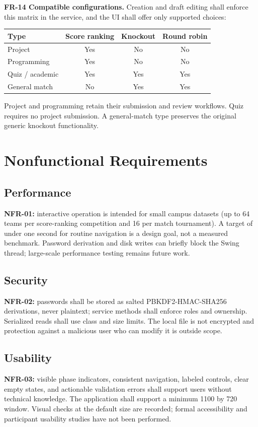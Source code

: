 \documentclass[12pt]{article}
\begin{document}
\textbf{FR-14 Compatible configurations.} Creation and draft editing shall enforce this matrix in the service, and the UI shall offer only supported choices:
\begin{tabularx}{\linewidth}{Yccc}\toprule Type & Score ranking & Knockout & Round robin\\\midrule
Project & Yes & No & No\\ Programming & Yes & No & No\\ Quiz / academic & Yes & Yes & Yes\\ General match & No & Yes & Yes\\\bottomrule\end{tabularx}
Project and programming retain their submission and review workflows. Quiz requires no project submission. A general-match type preserves the original generic knockout functionality.

\section{Nonfunctional Requirements}
\subsection{Performance}
\textbf{NFR-01:} interactive operation is intended for small campus datasets (up to 64 teams per score-ranking competition and 16 per match tournament). A target of under one second for routine navigation is a design goal, not a measured benchmark. Password derivation and disk writes can briefly block the Swing thread; large-scale performance testing remains future work.
\subsection{Security}
\textbf{NFR-02:} passwords shall be stored as salted PBKDF2-HMAC-SHA256 derivations, never plaintext; service methods shall enforce roles and ownership. Serialized reads shall use class and size limits. The local file is not encrypted and protection against a malicious user who can modify it is outside scope.
\subsection{Usability}
\textbf{NFR-03:} visible phase indicators, consistent navigation, labeled controls, clear empty states, and actionable validation errors shall support users without technical knowledge. The application shall support a minimum 1100 by 720 window. Visual checks at the default size are recorded; formal accessibility and participant usability studies have not been performed.
\end{document}
